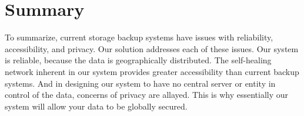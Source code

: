 \section{Summary}

To summarize, current storage backup systems have issues with reliability, accessibility, and privacy.  Our solution addresses each of these issues.  Our system is reliable, because the data is geographically distributed.  The self-healing network inherent in our system provides greater accessibility than current backup systems.  And in designing our system to have no central server or entity in control of the data, concerns of privacy are allayed. This is why essentially our system will allow your data to be globally secured. 